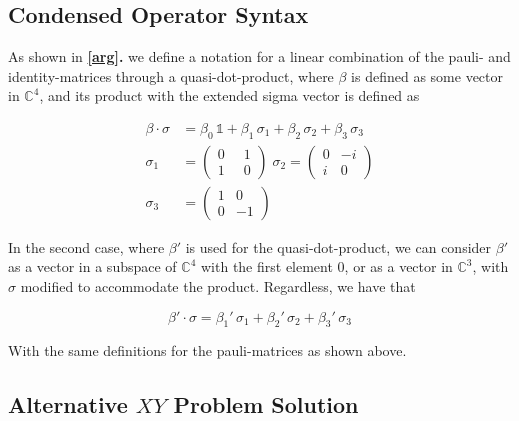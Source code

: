 \documentclass[11pt,twocolumn]{article}
\begin{document}

	\subsection{Condensed Operator Syntax}

	As shown in \textbf{\ref{arg}.} we define a notation for a linear combination of the pauli- and identity-matrices through a quasi-dot-product, where $\beta$ is defined as some vector in $\mathbb{C}^4$, and its product with the extended sigma vector is defined as

	\begin{align*}
		\beta \cdot \sigma &= \beta_0\, \mathds{1} + \beta_1\, \sigma_1 + \beta_2\, \sigma_2 + \beta_3\, \sigma_3\\[3mm]
		\sigma_1 &= 
		\begin{pmatrix}
			0 & \;\;1\\[1mm]
			1 & \;\;0
		\end{pmatrix}
		\;
		\sigma_2 = 
		\begin{pmatrix}
			0 & -i\\[1mm]
			i & 0
		\end{pmatrix}
		\\[3mm]
		\sigma_3 &= 
		\begin{pmatrix}
			1 & 0\\[1mm]
			0 & -1
		\end{pmatrix}
	\end{align*}

	In the second case, where $\beta'$ is used for the quasi-dot-product, we can consider $\beta'$ as a vector in a subspace of $\mathbb{C}^4$ with the first element $0$, or as a vector in $\mathbb{C}^3$, with $\sigma$ modified to accommodate the product. Regardless, we have that

	\begin{equation*}
	\beta' \cdot \sigma = \beta_1'\, \sigma_1 + \beta_2'\, \sigma_2 + \beta_3'\, \sigma_3
	\end{equation*}

	With the same definitions for the pauli-matrices as shown above.
    
    \subsection{Alternative $XY$ Problem Solution}
\end{document}
